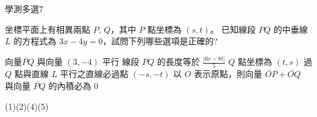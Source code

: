     \begin{QUESTION}
        \begin{ExamInfo}{96}{學測}{多選}{7}
        \end{ExamInfo}
        \begin{ExamAnsRateInfo}{25}{42}{20}{13}
        \end{ExamAnsRateInfo}
        \begin{QBODY}
            坐標平面上有相異兩點 $P$, $Q$，其中 $P$ 點坐標為 $(s,t)$。
			已知線段 $PQ$ 的中垂線 $L$ 的方程式為 $3x - 4 y = 0$，試問下列哪些選項是正確的? 
    		\begin{QOPS} 
    			\QOP 向量$\lvec{PQ}$ 與向量 $(3,-4)$  平行 
    			\QOP 線段 $\overline{PQ}$ 的長度等於 $\frac{|6s-8t|}{5}$ 
    			\QOP $Q$ 點坐標為 $(t,s)$ 
    			\QOP 過 $Q$ 點與直線 $L$ 平行之直線必過點 $(-s,-t)$ 
    			\QOP 以 $O$ 表示原點，則向量 $\lvec{OP}+\lvec{OQ}$ 與向量 $\lvec{PQ}$ 的內積必為 0 
    		\end{QOPS}
        \end{QBODY}
        \begin{QFROMS}
        \end{QFROMS}
        \begin{QTAGS}\end{QTAGS}
        \begin{QANS}
            (1)(2)(4)(5)
        \end{QANS}
        \begin{QSOLLIST}
        \end{QSOLLIST}
        \begin{QEMPTYSPACE}
        \end{QEMPTYSPACE}
    \end{QUESTION}
